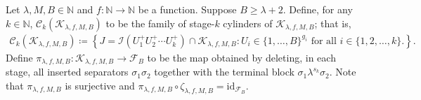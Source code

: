 \documentclass[12pt,reqno]{amsart}
\theoremstyle{definition}
\theoremstyle{plain}
\begin{document}
Let $\lambda,M,B\in\mathbb{N}$ and $f:\mathbb{N}\to\mathbb{N}$ be a function. Suppose $B\geq\lambda+2$. Define, for any $k\in\mathbb{N}$, $\mathscr{C}_k(\mathcal{K}_{\lambda,f,M,B})$ to be the family of stage-$k$ cylinders of $\mathcal{K}_{\lambda,f,M,B}$; that is,
\begin{align*}
    \mathscr{C}_k(\mathcal{K}_{\lambda,f,M,B})
    \coloneqq
    \left\{J=\mathcal{I}\!\left(U^+_1U^+_2\cdots U^+_k\right)\cap\mathcal{K}_{\lambda,f,M,B}:
    U_i\in\{1,\dots,B\}^{g_i}\text{ for all $i\in\{1,2,\ldots,k\}$.}\right\}.
\end{align*}
Define $\pi_{\lambda,f,M,B}:\mathcal{K}_{\lambda,f,M,B}\to \mathcal{F}_B$ to be the map obtained by deleting, in each stage, all inserted separators $\sigma_1\sigma_2$ together with the terminal block $\sigma_1\lambda^{s_k}\sigma_2$. Note that $\pi_{\lambda,f,M,B}$ is surjective and $\pi_{\lambda,f,M,B}\circ\zeta_{\lambda,f,M,B}=\mathrm{id}_{\mathcal{F}_B}$.
\end{document}
